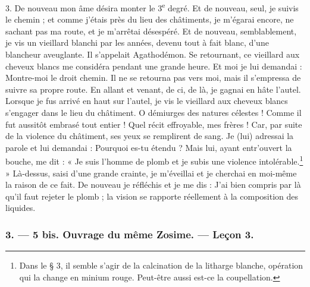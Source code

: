 \documentclass[landscape, a4paper, 11pt, oneside, polutonikogreek, french]{article}
\begin{document}
3. De nouveau mon âme désira monter le 3\textsuperscript{e} degré. Et de nouveau, seul, je suivis le chemin ; et comme j'étais près du lieu des châtiments, je m'égarai encore, ne sachant pas ma route, et je m'arrêtai désespéré. Et de nouveau, semblablement, je vis un vieillard blanchi par les années, devenu tout à fait blanc, d'une blancheur aveuglante. Il s'appelait Agathodémon. Se retournant, ce vieillard aux cheveux blancs me considéra pendant une grande heure. Et moi je lui demandai : Montre-moi le droit chemin. Il ne se retourna pas vers moi, mais il s'empressa de suivre sa propre route. En allant et venant, de ci, de là, je gagnai en hâte l'autel. Lorsque je fus arrivé en haut sur l'autel, je vis le vieillard aux cheveux blancs s'engager dans le lieu du châtiment. O démiurges des natures célestes ! Comme il fut aussitôt embrasé tout entier ! Quel récit effroyable, mes frères ! Car, par suite de la violence du châtiment, ses yeux se remplirent de sang. Je (lui) adressai la parole et lui demandai : Pourquoi es-tu étendu ? Mais lui, ayant entr'ouvert la bouche, me dit : « Je suis l'homme de plomb et je subis une violence intolérable.\footnote{Dans le § 3, il semble s'agir de la calcination de la litharge blanche, opération qui la change en minium rouge. Peut-être aussi est-ce la coupellation.} » Là-dessus, saisi d'une grande crainte, je m'éveillai et je cherchai en moi-même la raison de ce fait. De nouveau je réfléchis et je me dis : J'ai bien compris par là qu'il faut rejeter le plomb ; la vision se rapporte réellement à la composition des liquides.

\bigskip
\centerline{\EightStarTaper}
\centerline{\EightStarTaper\EightStarTaper}
\bigskip

\subsubsection{3. --- 5 bis. Ouvrage du même Zosime. --- Leçon 3.}
\end{document}
